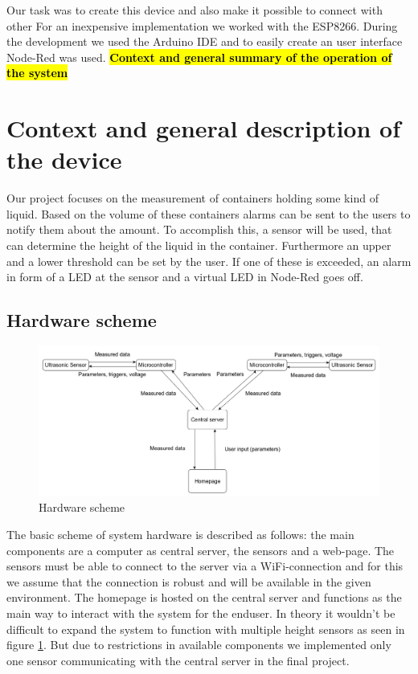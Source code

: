 \documentclass{article}
\begin{document}
Our task was to create this device and also make it possible to connect with other 
For an inexpensive implementation we worked with the ESP8266. During the development we used the Arduino IDE and to easily create an user interface Node-Red was used.
\textcolor{red}{\textbf{\hl{Context and general summary of the operation of the system}}}

\section{Context and general description of the device}

Our project focuses on the measurement of containers holding some kind of liquid. Based on the volume of these containers alarms can be sent to the users to notify them about the amount. To accomplish this, a sensor will be used, that can determine the height of the liquid in the container. Furthermore an upper and a lower threshold can be set by the user. If one of these is exceeded, an alarm in form of a LED at the sensor and a virtual LED in Node-Red goes off.\par

\subsection{Hardware scheme}

\begin{figure}[h]
\hspace{-1cm}
\includegraphics[scale=0.325]{images/circuit3.png}
\caption{Hardware scheme}
\label{scheme}
\end{figure}

The basic scheme of system hardware is described as follows: the main components
are a computer as central server, the sensors and a web-page. The
sensors must be able to connect to the server via a WiFi-connection and for this
we assume that the connection is robust and will be available in the given
environment. The homepage is hosted on the central server and functions as the main way to interact with the system for the enduser. In theory it wouldn't be difficult to expand the system to function with multiple height sensors as seen in figure \ref{scheme}. But due to restrictions in available components we implemented only one sensor communicating with the central server in the final project.\par
\end{document}
